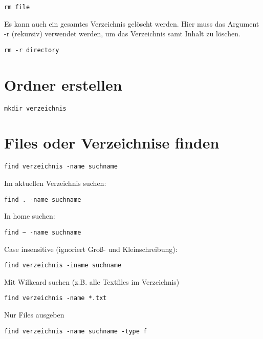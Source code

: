 \documentclass[]{book}
\begin{document}
\begin{verbatim}
rm file
\end{verbatim}

Es kann auch ein gesamtes Verzeichnis gelöscht werden. Hier muss das Argument -r (rekursiv) verwendet werden, um das Verzeichnis
samt Inhalt zu löschen.

\begin{verbatim}
rm -r directory
\end{verbatim}

\hypertarget{ordner-erstellen}{%
\section{Ordner erstellen}\label{ordner-erstellen}}

\begin{verbatim}
mkdir verzeichnis
\end{verbatim}

\hypertarget{files-oder-verzeichnise-finden}{%
\section{Files oder Verzeichnise finden}\label{files-oder-verzeichnise-finden}}

\begin{verbatim}
find verzeichnis -name suchname
\end{verbatim}

Im aktuellen Verzeichnis suchen:

\begin{verbatim}
find . -name suchname
\end{verbatim}

In home suchen:

\begin{verbatim}
find ~ -name suchname
\end{verbatim}

Case insensitive (ignoriert Groß- und Kleinschreibung):

\begin{verbatim}
find verzeichnis -iname suchname
\end{verbatim}

Mit Wilkcard suchen (z.B. alle Textfiles im Verzeichnis)

\begin{verbatim}
find verzeichnis -name *.txt
\end{verbatim}

Nur Files ausgeben

\begin{verbatim}
find verzeichnis -name suchname -type f
\end{verbatim}
\end{document}
